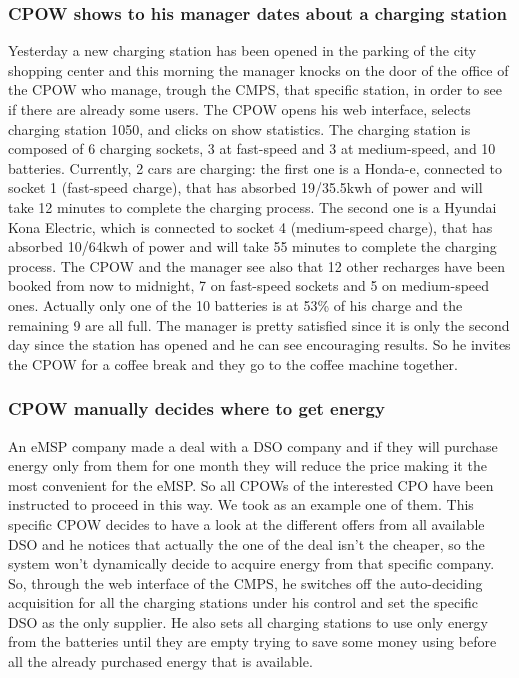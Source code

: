 \documentclass[a4paper]{report}
\begin{document}
\subsubsection{CPOW shows to his manager dates about a charging station}
Yesterday a new charging station has been opened in the parking of the city shopping center and this morning the manager knocks on the door of the office of the CPOW who manage, trough the CMPS, that specific station, in order to see if there are already some users. The CPOW opens his web interface, selects charging station 1050, and clicks on show statistics. The charging station is composed of 6 charging sockets, 3 at fast-speed and 3 at medium-speed, and 10 batteries. Currently, 2 cars are charging: the first one is a Honda-e, connected to socket 1 (fast-speed charge), that has absorbed 19/35.5kwh of power and will take 12 minutes to complete the charging process. The second one is a Hyundai	Kona Electric, which is connected to socket 4 (medium-speed charge), that has absorbed 10/64kwh of power and will take 55 minutes to complete the charging process. The CPOW and the manager see also that 12 other recharges have been booked from now to midnight, 7 on fast-speed sockets and 5 on medium-speed ones. Actually only one of the 10 batteries is at 53\% of his charge and the remaining 9 are all full. The manager is pretty satisfied since it is only the second day since the station has opened and he can see encouraging results. So he invites the CPOW for a coffee break and they go to the coffee machine together.

\subsubsection{CPOW manually decides where to get energy}
An eMSP company made a deal with a DSO company and if they will purchase energy only from them for one month they will reduce the price making it the most convenient for the eMSP. So all CPOWs of the interested CPO have been instructed to proceed in this way. We took as an example one of them. This specific CPOW decides to have a look at the different offers from all available DSO and he notices that actually the one of the deal isn't the cheaper, so the system won't dynamically decide to acquire energy from that specific company. So, through the web interface of the CMPS, he switches off the auto-deciding acquisition for all the charging stations under his control and set the specific DSO as the only supplier. He also sets all charging stations to use only energy from the batteries until they are empty trying to save some money using before all the already purchased energy that is available. 
\end{document}
